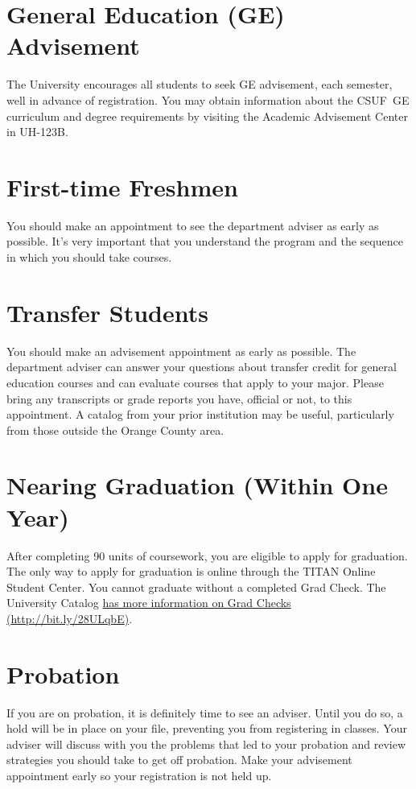 \documentclass{book}
\newcommand{\CampusName}{CSUF}
\begin{document}
\section{General Education (GE) Advisement}
 
The University encourages all students to seek GE advisement, each semester, well in advance of registration.  You may obtain information about the \CampusName~GE curriculum and degree requirements by visiting the Academic Advisement Center in UH-123B.

\section{First-time Freshmen}
You should make an appointment to see the department adviser as early as possible. It's very important that you understand the program and the sequence in which you should take courses.

\section{Transfer Students}
You should make an advisement appointment as early as possible. The department adviser can answer your questions about transfer credit for general education courses and can evaluate courses that apply to your major. Please bring any transcripts or grade reports you have, official or not, to this appointment. A catalog from your prior institution may be useful, particularly from those outside the Orange County area.

\section{Nearing Graduation (Within One Year)}
After completing 90 units of coursework, you are eligible to apply for graduation. The only way to apply for graduation is online through the TITAN Online Student Center. You cannot graduate without a completed Grad Check.  The University Catalog \href{http://catalog.fullerton.edu/content.php?catoid=2&navoid=108#Graduation_Requirement_Check}{has more information on Grad Checks (\url{http://bit.ly/28ULqbE})}.

\section{Probation}
If you are on probation, it is definitely time to see an adviser. Until you do so, a hold will be in place on your file, preventing you from registering in classes. Your adviser will discuss with you the problems that led to your probation and review strategies you should take to get off probation. Make your advisement appointment early so your registration is not held up.
\end{document}

